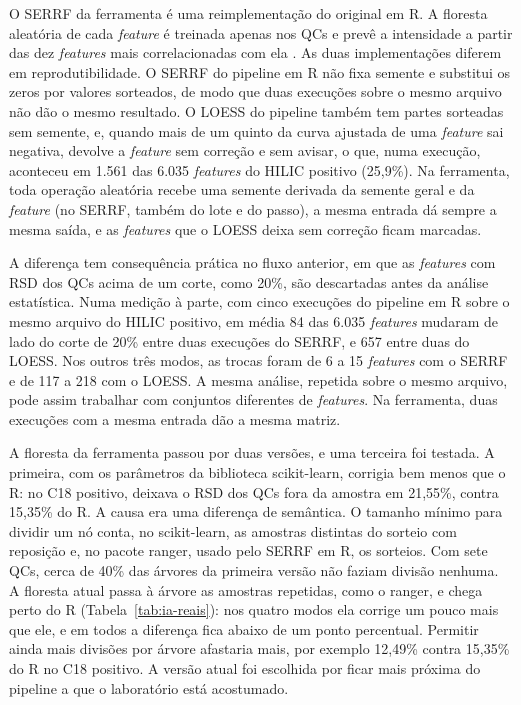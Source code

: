 O SERRF da ferramenta é uma reimplementação do original em R. A floresta aleatória \cite{breiman2001random} de cada \emph{feature} é treinada apenas nos QCs e prevê a intensidade a partir das dez \emph{features} mais correlacionadas com ela \cite{fan2019systematic}. As duas implementações diferem em reprodutibilidade. O SERRF do pipeline em R não fixa semente e substitui os zeros por valores sorteados, de modo que duas execuções sobre o mesmo arquivo não dão o mesmo resultado. O LOESS do pipeline também tem partes sorteadas sem semente, e, quando mais de um quinto da curva ajustada de uma \emph{feature} sai negativa, devolve a \emph{feature} sem correção e sem avisar, o que, numa execução, aconteceu em 1.561 das 6.035 \emph{features} do HILIC positivo (25,9\%). Na ferramenta, toda operação aleatória recebe uma semente derivada da semente geral e da \emph{feature} (no SERRF, também do lote e do passo), a mesma entrada dá sempre a mesma saída, e as \emph{features} que o LOESS deixa sem correção ficam marcadas.

A diferença tem consequência prática no fluxo anterior, em que as \emph{features} com RSD dos QCs acima de um corte, como 20\%, são descartadas antes da análise estatística. Numa medição à parte, com cinco execuções do pipeline em R sobre o mesmo arquivo do HILIC positivo, em média 84 das 6.035 \emph{features} mudaram de lado do corte de 20\% entre duas execuções do SERRF, e 657 entre duas do LOESS. Nos outros três modos, as trocas foram de 6 a 15 \emph{features} com o SERRF e de 117 a 218 com o LOESS. A mesma análise, repetida sobre o mesmo arquivo, pode assim trabalhar com conjuntos diferentes de \emph{features}. Na ferramenta, duas execuções com a mesma entrada dão a mesma matriz.

A floresta da ferramenta passou por duas versões, e uma terceira foi testada. A primeira, com os parâmetros da biblioteca scikit-learn, corrigia bem menos que o R: no C18 positivo, deixava o RSD dos QCs fora da amostra em 21,55\%, contra 15,35\% do R. A causa era uma diferença de semântica. O tamanho mínimo para dividir um nó conta, no scikit-learn, as amostras distintas do sorteio com reposição e, no pacote ranger, usado pelo SERRF em R, os sorteios. Com sete QCs, cerca de 40\% das árvores da primeira versão não faziam divisão nenhuma. A floresta atual passa à árvore as amostras repetidas, como o ranger, e chega perto do R (Tabela~\ref{tab:ia-reais}): nos quatro modos ela corrige um pouco mais que ele, e em todos a diferença fica abaixo de um ponto percentual. Permitir ainda mais divisões por árvore afastaria mais, por exemplo 12,49\% contra 15,35\% do R no C18 positivo. A versão atual foi escolhida por ficar mais próxima do pipeline a que o laboratório está acostumado.

